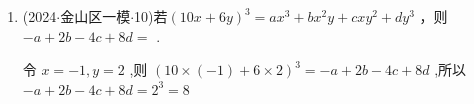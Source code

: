 \begin{enumerate}
    \item (2024$\cdot$金山区一模$\cdot$10)若$(10x + 6y)^{3} = a{x}^{3} + b{x}^{2}y + {cx}{y}^{2} + d{y}^{3}$ ，则 $- a + {2b} - {4c} + {8d} =$ .
    \begin{jieda}
        令 $x =  - 1,y = 2$ ,则 ${\left( {10} \times  \left( -1\right)  + 6 \times  2\right) }^{3} =  - a + {2b} - {4c} + {8d}$ ,所以 $- a + {2b} - {4c} + {8d} = {2}^{3} = 8$
    \end{jieda}
\end{enumerate}